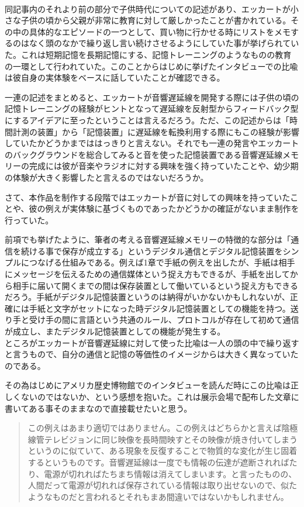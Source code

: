 \documentclass[a4paper,report]{jsbook}
\begin{document}
\autocite[筆者訳]{eckstein1996j}\\
同記事内のそれより前の部分で子供時代についての記述があり、エッカートが小さな子供の頃から父親が非常に教育に対して厳しかったことが書かれている。その中の具体的なエピソードの一つとして、買い物に行かせる時にリストをメモするのはなく頭のなかで繰り返し言い続けさせるようにしていた事が挙げられていた。これは短期記憶を長期記憶にする、記憶トレーニングのようなものの教育の一環として行われていた。このことからはじめに挙げたインタビューでの比喩は彼自身の実体験をベースに話していたことが確認できる。

一連の記述をまとめると、エッカートが音響遅延線を開発する際には子供の頃の記憶トレーニングの経験がヒントとなって遅延線を反射型からフィードバック型にするアイデアに至ったということは言えるだろう。ただ、この記述からは「時間計測の装置」から「記憶装置」に遅延線を転換利用する際にもこの経験が影響していたかどうかまでははっきりと言えない。それでも一連の発言やエッカートのバックグラウンドを総合してみると音を使った記憶装置である音響遅延線メモリーの完成には彼が音楽やラジオに対する興味を強く持っていたことや、幼少期の体験が大きく影響したと言えるのではないだろうか。

さて、本作品を制作する段階ではエッカートが音に対しての興味を持っていたことや、彼の例えが実体験に基づくものであったかどうかの確証がないまま制作を行っていた。

前項でも挙げたように、筆者の考える音響遅延線メモリーの特徴的な部分は「通信を続ける事で保存が成立する」というデジタル通信とデジタル記憶装置をシンプルにつなげる仕組みである。例えば1章で手紙の例えを出したが、手紙は相手にメッセージを伝えるための通信媒体という捉え方もできるが、手紙を出してから相手に届いて開くまでの間は保存装置として働いているという捉え方もできるだろう。手紙がデジタル記憶装置というのは納得がいかないかもしれないが、正確には手紙と文字がセットになった時デジタル記憶装置としての機能を持つ。送り手と受け手の間に言語という共通のルール、プロトコルが存在して初めて通信が成立し、またデジタル記憶装置としての機能が発生する。\\
ところがエッカートが音響遅延線に対して使った比喩は一人の頭の中で繰り返すと言うもので、自分の通信と記憶の等価性のイメージからは大きく異なっていたのである。

その為はじめにアメリカ歴史博物館でのインタビューを読んだ時にこの比喩は正しくないのではないか、という感想を抱いた。これは展示会場で配布した文章に書いてある事そのままなので直接載せたいと思う。

\begin{quote}
この例えはあまり適切ではありません。この例えはどちらかと言えば陰極線管テレビジョンに同じ映像を長時間映すとその映像が焼き付いてしまうというのに似ていて、ある現象を反復することで物質的な変化が生じ固着するというものです。音響遅延線は一度でも情報の伝達が遮断されればたり、電源が切れればたちまち情報は消えてしまいます。と言ったものの、人間だって電源が切れれば保存されている情報は取り出せないので、似たようなものだと言われるとそれもまあ間違いではないかもしれません。
\end{quote}
\end{document}
